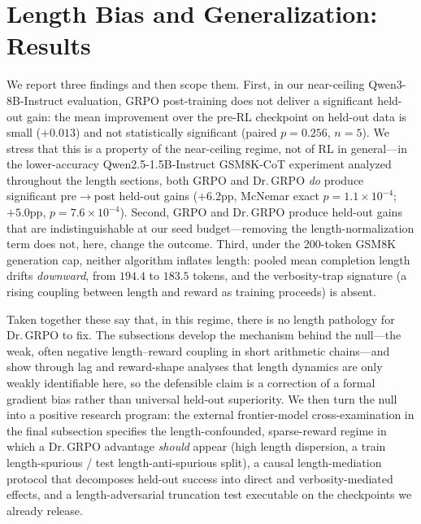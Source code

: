 \section{Length Bias and Generalization: Results}
\label{sec:p4-results}
We report three findings and then scope them. First, in our near-ceiling
Qwen3-8B-Instruct evaluation, GRPO post-training does not deliver a significant
held-out gain: the mean improvement over the pre-RL checkpoint on held-out data is
small ($+0.013$) and not statistically significant (paired $p=0.256$, $n{=}5$). We
stress that this is a property of the near-ceiling regime, not of RL in general---in
the lower-accuracy Qwen2.5-1.5B-Instruct GSM8K-CoT experiment analyzed throughout
the length sections, both GRPO and Dr.\,GRPO \emph{do} produce significant
pre$\to$post held-out gains ($+6.2$pp, McNemar exact $p=1.1\times10^{-4}$;
$+5.0$pp, $p=7.6\times10^{-4}$). Second, GRPO
and Dr.\,GRPO produce held-out gains that are indistinguishable at our seed
budget---removing the length-normalization term does not, here, change the
outcome. Third, under the 200-token GSM8K generation cap, neither algorithm
inflates length: pooled mean completion length drifts \emph{downward}, from
$194.4$ to $183.5$ tokens, and the verbosity-trap signature (a rising
coupling between length and reward as training proceeds) is absent.

Taken together these say that, in this regime, there is no length pathology for
Dr.\,GRPO to fix. The subsections develop the mechanism behind the null---the
weak, often negative length--reward coupling in short arithmetic
chains---and show through lag and reward-shape analyses that length dynamics are
only weakly identifiable here, so the defensible claim is a correction of a formal
gradient bias rather than universal held-out superiority. We then turn the null into
a positive research program: the external frontier-model cross-examination in the
final subsection specifies the length-confounded, sparse-reward regime in which a
Dr.\,GRPO advantage \emph{should} appear (high length dispersion, a train
length-spurious / test length-anti-spurious split), a causal length-mediation
protocol that decomposes held-out success into direct and verbosity-mediated
effects, and a length-adversarial truncation test executable on the checkpoints we
already release.
